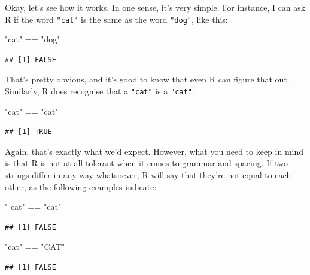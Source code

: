 \documentclass[
]{book}
\newenvironment{Shaded}{\begin{snugshade}}{\end{snugshade}}
\newcommand{\SpecialCharTok}[1]{\textcolor[rgb]{0.00,0.00,0.00}{#1}}
\newcommand{\StringTok}[1]{\textcolor[rgb]{0.31,0.60,0.02}{#1}}
\begin{document}
Okay, let's see how it works. In one sense, it's very simple. For instance, I can ask R if the word \texttt{"cat"} is the same as the word \texttt{"dog"}, like this:

\begin{Shaded}
\begin{Highlighting}[]
\StringTok{"cat"} \SpecialCharTok{==} \StringTok{"dog"}
\end{Highlighting}
\end{Shaded}

\begin{verbatim}
## [1] FALSE
\end{verbatim}

That's pretty obvious, and it's good to know that even R can figure that out. Similarly, R does recognise that a \texttt{"cat"} is a \texttt{"cat"}:

\begin{Shaded}
\begin{Highlighting}[]
\StringTok{"cat"} \SpecialCharTok{==} \StringTok{"cat"}
\end{Highlighting}
\end{Shaded}

\begin{verbatim}
## [1] TRUE
\end{verbatim}

Again, that's exactly what we'd expect. However, what you need to keep in mind is that R is not at all tolerant when it comes to grammar and spacing. If two strings differ in any way whatsoever, R will say that they're not equal to each other, as the following examples indicate:

\begin{Shaded}
\begin{Highlighting}[]
\StringTok{" cat"} \SpecialCharTok{==} \StringTok{"cat"}
\end{Highlighting}
\end{Shaded}

\begin{verbatim}
## [1] FALSE
\end{verbatim}

\begin{Shaded}
\begin{Highlighting}[]
\StringTok{"cat"} \SpecialCharTok{==} \StringTok{"CAT"}
\end{Highlighting}
\end{Shaded}

\begin{verbatim}
## [1] FALSE
\end{verbatim}
\end{document}
